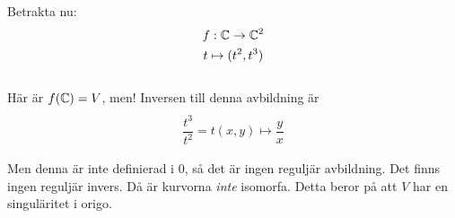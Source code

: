\noindent Betrakta nu:
\begin{equation*}
  \begin{gathered}
    f:\mathbb{C}\to\mathbb{C}^2\\
    t\mapsto (t^2,t^3)
  \end{gathered}
\end{equation*}\\
\noindent Här är $f(\mathbb{C}) = V$, men! Inversen till denna avbildning är
\begin{equation*}
  \begin{gathered}\\
    \dfrac{t^3}{t^2} = t
    (x,y)\mapsto \dfrac{y}{x}
  \end{gathered}
\end{equation*}\par
\noindent Men denna är inte definierad i 0, så det är ingen reguljär avbildning. Det finns ingen reguljär invers. Då är kurvorna \textit{inte} isomorfa. Detta beror på att $V$ har en singuläritet i origo. 
\par\bigskip
